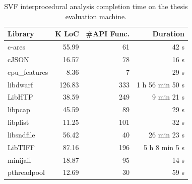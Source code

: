 \begin{table}[htb]
\centering
\caption{SVF interprocedural analysis completion time on the thesis evaluation machine.}
\label{tab:svf_runtime_adjusted}
\begin{tabular}{lrrr}
\toprule
\textbf{Library} & \textbf{K LoC} & \textbf{\#API Func.} & \textbf{Duration} \\
\midrule
c-ares        &  55.99 &  61 & 42 s \\
cJSON         &  16.57 &  78 & 16 s \\
cpu\_features &   8.36 &   7 & 29 s \\
libdwarf      & 126.83 & 333 & 1 h 56 min 50 s \\
LibHTP        &  38.59 & 249 & 9 min 21 s \\
libpcap       &  45.59 &  89 & 29 s \\
libplist      &  11.25 & 101 & 32 s \\
libsndfile    &  56.42 &  40 & 26 min 23 s \\
LibTIFF       &  87.16 & 196 & 5 h 8 min 5 s \\
minijail      &  18.87 &  95 & 14 s \\
pthreadpool   &  12.69 &  30 & 59 s \\
\bottomrule
\end{tabular}
\end{table}

\begin{table}[htb]
\centering
\caption{Primitive-only API ratio vs. achieved line coverage (Ours).}
\label{tab:primitive_api_ratio}
\small
\setlength{\tabcolsep}{4pt}
\end{table}

